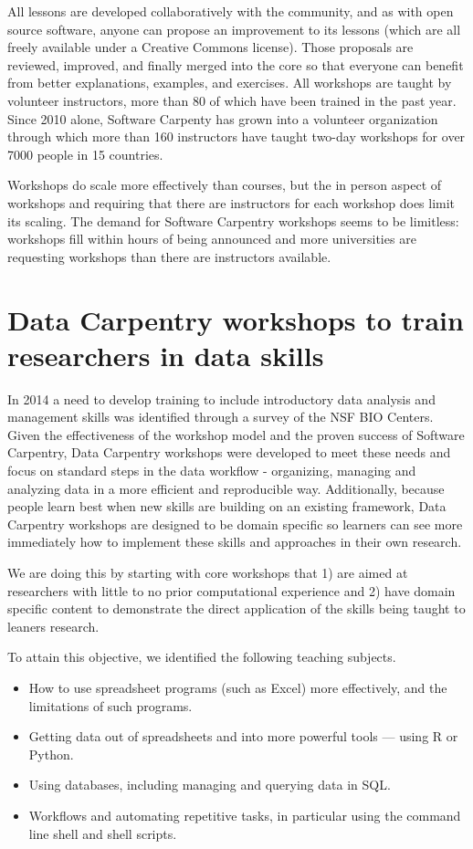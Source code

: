 \documentclass[15]{idcc}
\begin{document}
All lessons are developed
collaboratively with the community, and as with open source software, anyone can propose an improvement to its lessons (which are all
freely available under a Creative Commons license).  Those proposals are reviewed, improved, and finally merged into the core so that
everyone can benefit from better explanations, examples, and exercises. All workshops are taught by volunteer instructors, more than 80
of which have been trained in the past year. Since 2010 alone, Software Carpenty has grown into a volunteer organization through which more than 160 instructors have
taught two-day workshops for over 7000 people in 15 countries.

Workshops do scale more effectively than courses, but the in person aspect of workshops and requiring that there are instructors
 for each workshop does limit its scaling. The demand for Software Carpentry workshops seems to be limitless:  workshops
fill within hours of being announced and more universities are requesting workshops than there are instructors available.

\section{Data Carpentry workshops to train researchers in data skills}

In 2014 a need to develop training to include introductory data analysis and management skills was identified through a survey of the
NSF BIO Centers. Given the effectiveness of the workshop model and the proven success of Software Carpentry,
Data Carpentry workshops were developed to meet these needs and focus on standard steps in the data workflow - organizing, managing and analyzing data
in a more efficient and reproducible way. Additionally, because people learn best when new skills are building on
an existing framework, Data Carpentry workshops are designed to be domain specific so learners can see more
immediately how to implement these skills and approaches in their own research.

We are doing this by starting with core workshops that 1) are aimed at researchers with little to no
prior computational experience and 2) have domain specific content to demonstrate
the direct application of the skills being taught to leaners research.


To attain this objective, we identified the following teaching subjects.
\begin{itemize}
\item How to use spreadsheet programs (such as Excel) more effectively, and the limitations of such programs.
\item Getting data out of spreadsheets and into more powerful tools --- using R or Python.
\item Using databases, including managing and querying data in SQL.
\item Workflows and automating repetitive tasks, in particular using the command line shell and shell scripts.
\end{itemize}
\end{document}
